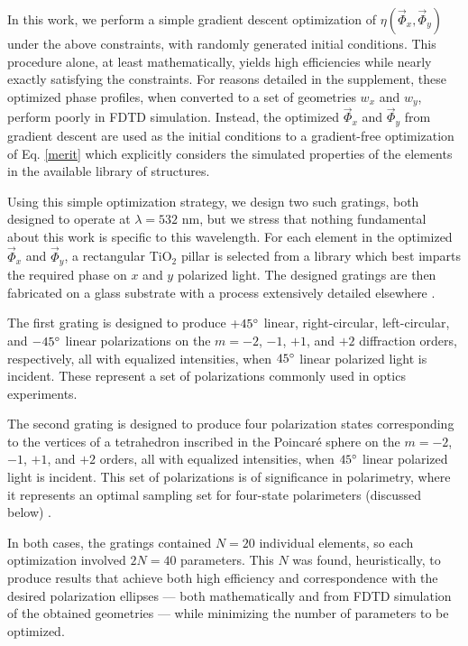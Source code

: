 \documentclass[footinbib,aps,prl,twocolumn,superscriptaddress]{revtex4-1}
\begin{document}
In this work, we perform a simple gradient descent optimization of $\eta(\vec{\Phi}_x, \vec{\Phi}_y)$ under the above constraints, with randomly generated initial conditions. This procedure alone, at least mathematically, yields high efficiencies while nearly exactly satisfying the constraints. For reasons detailed in the supplement, these optimized phase profiles, when converted to a set of geometries $w_x$ and $w_y$, perform poorly in FDTD simulation. Instead, the optimized $\vec{\Phi}_x$ and $\vec{\Phi}_y$ from gradient descent are used as the initial conditions to a gradient-free optimization of Eq. \ref{merit} which explicitly considers the simulated properties of the elements in the available library of structures.

Using this simple optimization strategy, we design two such gratings, both designed to operate at $\lambda = 532$ nm, but we stress that nothing fundamental about this work is specific to this wavelength. For each element in the optimized $\vec{\Phi}_x$ and $\vec{\Phi}_y$, a rectangular TiO$_2$ pillar is selected from a library which best imparts the required phase on $x$ and $y$ polarized light. The designed gratings are then fabricated on a glass substrate with a process extensively detailed elsewhere \cite{Devlin2016a}.

The first grating is designed to produce $+45\degree$ linear, right-circular, left-circular, and $-45\degree$ linear polarizations on the $m = -2$, $-1$, $+1$, and $+2$ diffraction orders, respectively, all with equalized intensities, when $45\degree$ linear polarized light is incident. These represent a set of polarizations commonly used in optics experiments.

The second grating is designed to produce four polarization states corresponding to the vertices of a tetrahedron inscribed in the Poincar\'e sphere on the $m = -2$, $-1$, $+1$, and $+2$ orders, all with equalized intensities, when $45
\degree$ linear polarized light is incident. This set of polarizations is of significance in polarimetry, where it represents an optimal sampling set for four-state polarimeters (discussed below) \cite{Sabatke2000, Tyo2002}.

In both cases, the gratings contained $N = 20$ individual elements, so each optimization involved $2N = 40$ parameters. This $N$ was found, heuristically, to produce results that achieve both high efficiency and correspondence with the desired polarization ellipses --- both mathematically and from FDTD simulation of the obtained geometries --- while minimizing the number of parameters to be optimized.
\end{document}
